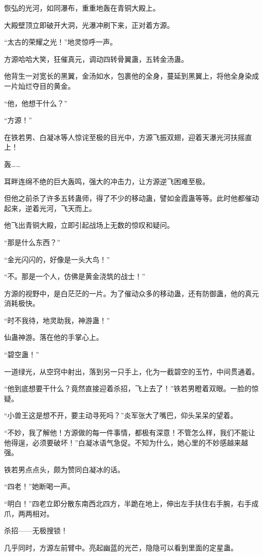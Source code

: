 \begin{this_body}
恢弘的光河，如同瀑布，重重地轰在青铜大殿上。

大殿壁顶立即破开大洞，光瀑冲刷下来，正对着方源。

“太古的荣耀之光！”地灵惊呼一声。

方源哈哈大笑，狂催真元，调动四转骨翼蛊，五转金汤蛊。

他背生一对宽长的黑翼，金汤如水，包裹他的全身，蔓延到黑翼上，将他全身染成一片灿烂夺目的黄金。

“他，他想干什么？”

“方源！”

在铁若男、白凝冰等人惊诧至极的目光中，方源飞振双翅，迎着天瀑光河扶摇直上！

轰……

耳畔连绵不绝的巨大轰鸣，强大的冲击力，让方源逆飞困难至极。

但他之前杀了许多五转蛊师，得了不少的移动蛊，譬如金霞蛊等等。此时他都催动起来，逆着光河，飞天而上。

他飞出青铜大殿，立即引起战场上无数的惊叹和疑问。

“那是什么东西？”

“金光闪闪的，好像是一头大鸟！”

“不。那是一个人，仿佛是黄金浇筑的战士！”

方源的视野中，是白茫茫的一片。为了催动众多的移动蛊，还有防御蛊，他的真元消耗极快。

“时不我待，地灵助我，神游蛊！”

仙蛊神游。落在他的手掌心上。

“碧空蛊！”

一道绿光，从空窍中射出，落到另一只手上，化为一截碧空的玉竹，中间贯通着。

“他到底想要干什么？竟然直接迎着杀招，飞上去了！”铁若男瞪着双眼。一脸的惊疑。

“小兽王这是想不开，要主动寻死吗？”炎军张大了嘴巴，仰头呆呆的望着。

“不妙，我了解他！方源做的每一件事情，都极有深意！不管怎么样，我们不能让他得逞，必须要破坏！”白凝冰语气急促。不知为什么，她心里的不妙感越来越强。

铁若男点点头，颇为赞同白凝冰的话。

“四老！”她断喝一声。

“明白！”四老立即分散东南西北四方，半跪在地上，伸出左手扶住右手腕，右手成爪，两两相对。

杀招——无极搜锁！

几乎同时，方源左前臂中。亮起幽蓝的光芒，隐隐可以看到里面的定星蛊。


\end{this_body}

